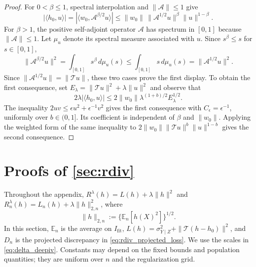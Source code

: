 \begin{proof}
For $0<\beta\leqslant1$, spectral interpolation and
$\|\mathcal A\|\leqslant1$ give
\[
|\langle h_0,u\rangle|
=|\langle w_0,\mathcal A^{\beta/2}u\rangle|
\leqslant
\|w_0\|\,\|\mathcal A^{1/2}u\|^\beta\|u\|^{1-\beta}.
\]
For $\beta>1$, the positive self-adjoint operator $\mathcal A$ has spectrum
in $[0,1]$ because $\|\mathcal A\|\leqslant1$. Let $\mu_u$ denote its
spectral measure associated with $u$. Since $s^\beta\leqslant s$ for
$s\in[0,1]$,
\[
\|\mathcal A^{\beta/2}u\|^2
=\int_{[0,1]}s^\beta\,d\mu_u(s)
\leqslant\int_{[0,1]}s\,d\mu_u(s)
=\|\mathcal A^{1/2}u\|^2.
\]
Since $\|\mathcal A^{1/2}u\|=\|\mathcal Tu\|$, these two cases prove
the first display. To obtain the first consequence, set
$E_\lambda=\|\mathcal Tu\|^2+\lambda\|u\|^2$ and observe that
\[
2\lambda|\langle h_0,u\rangle|
\leqslant 2\|w_0\|\lambda^{(1+b)/2}E_\lambda^{1/2}.
\]
The inequality $2uv\leqslant\epsilon u^2+\epsilon^{-1}v^2$ gives the first consequence with $C_\epsilon=\epsilon^{-1}$, uniformly over $b\in(0,1]$. Its coefficient is independent of $\beta$ and $\|w_0\|$. Applying the weighted form
of the same inequality to
$2\|w_0\|\|\mathcal Tu\|^b\|u\|^{1-b}$ gives the second consequence.
\end{proof}

\section[Proofs for RDIV]{Proofs of \cref{sec:rdiv}}

Throughout the appendix, $R^\lambda(h)=L(h)+\lambda\|h\|^2$ and
$R_n^\lambda(h)=L_n(h)+\lambda\|h\|_{2,n}^2$, where
\[
\|h\|_{2,n}:=\{\mathbb E_n[h(X)^2]\}^{1/2}.
\]
In this section, $\mathbb E_n$ is the average on $I_{\mathrm{fit}}$,
$L(h)=\sigma^2_{Y\mid Z}+\|\mathcal T(h-h_0)\|^2$, and $D_n$ is the projected discrepancy in \eqref{eq:rdiv_projected_loss}. We use the scales in \eqref{eq:delta_deepiv}. Constants may depend on the fixed bounds and population quantities; they are uniform over $n$ and the regularization grid.

